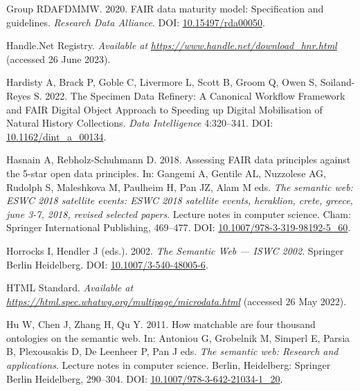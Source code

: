 \begin{CSLReferences}{1}{0}
\leavevmode{}%
Group RDAFDMMW. 2020. FAIR data maturity model: Specification and guidelines. \emph{Research Data Alliance}. DOI: \href{https://doi.org/10.15497/rda00050}{10.15497/rda00050}.

\leavevmode{}%
Handle.Net Registry. \emph{Available at} \href{https://www.handle.net/download_hnr.html}{\emph{https://www.handle.net/download\_hnr.html}} (accessed 26 June 2023).

\leavevmode{}%
Hardisty A, Brack P, Goble C, Livermore L, Scott B, Groom Q, Owen S, Soiland-Reyes S. 2022. The Specimen Data Refinery: A Canonical Workflow Framework and FAIR Digital Object Approach to Speeding up Digital Mobilisation of Natural History Collections. \emph{Data Intelligence} 4:320--341. DOI: \href{https://doi.org/10.1162/dint_a_00134}{10.1162/dint\_a\_00134}.

\leavevmode{}%
Hasnain A, Rebholz-Schuhmann D. 2018. Assessing FAIR data principles against the 5-star open data principles. In: Gangemi A, Gentile AL, Nuzzolese AG, Rudolph S, Maleshkova M, Paulheim H, Pan JZ, Alam M eds. \emph{The semantic web: ESWC 2018 satellite events: ESWC 2018 satellite events, heraklion, crete, greece, june 3-7, 2018, revised selected papers}. Lecture notes in computer science. Cham: Springer International Publishing, 469--477. DOI: \href{https://doi.org/10.1007/978-3-319-98192-5_60}{10.1007/978-3-319-98192-5\_60}.

\leavevmode{}%
Horrocks I, Hendler J (eds.). 2002. \emph{The Semantic Web --- ISWC 2002}. Springer Berlin Heidelberg. DOI: \href{https://doi.org/10.1007/3-540-48005-6}{10.1007/3-540-48005-6}.

\leavevmode{}%
HTML Standard. \emph{Available at} \href{https://html.spec.whatwg.org/multipage/microdata.html}{\emph{https://html.spec.whatwg.org/multipage/microdata.html}} (accessed 26 May 2022).

\leavevmode{}%
Hu W, Chen J, Zhang H, Qu Y. 2011. How matchable are four thousand ontologies on the semantic web. In: Antoniou G, Grobelnik M, Simperl E, Parsia B, Plexousakis D, De Leenheer P, Pan J eds. \emph{The semantic web: Research and applications}. Lecture notes in computer science. Berlin, Heidelberg: Springer Berlin Heidelberg, 290--304. DOI: \href{https://doi.org/10.1007/978-3-642-21034-1_20}{10.1007/978-3-642-21034-1\_20}.


\end{CSLReferences}
